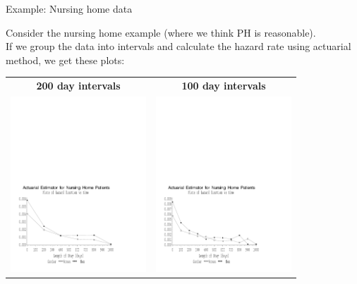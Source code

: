 \documentclass[envcountsect, 10pt, portrait, palatino]{beamer}
\begin{document}
\begin{frame}{Example: Nursing home data}

Consider the nursing home example (where we think PH is reasonable).
\\[2ex]
If we group the data into intervals and calculate the hazard rate using
actuarial method, we get these plots:

\begin{center}
\begin{tabular}{cc}
{\bf 200 day intervals} & {\bf 100 day intervals}\\
\includegraphics[width=2in]{hazards_nh1.pdf} &
\includegraphics[width=2in]{hazards_nh2.pdf}
\end{tabular}
\end{center}
\end{frame}
\end{document}

